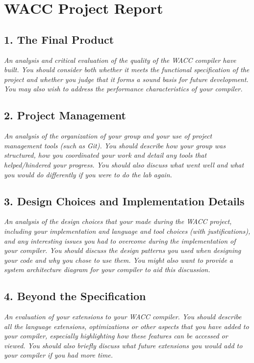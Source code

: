\documentclass[10pt,a4paper]{report}
\begin{document}
  \section*{WACC Project Report}


  \subsection*{1. The Final Product}
  \textit{An analysis and critical evaluation of the quality of the WACC compiler
  have built. You should consider both whether it meets the functional
  specification of the project and whether you judge that it forms a sound basis
  for future development. You may also wish to address the performance
  characteristics of your compiler.}

  \subsection*{2. Project Management}
  \textit{An analysis of the organization of your group and your use of project
  management tools (such as Git). You should describe how your group was
  structured, how you coordinated your work and detail any tools that
  helped/hindered your progress. You should also discuss what went well and what
  you would do differently if you were to do the lab again.}

  \subsection*{3. Design Choices and Implementation Details}
  \textit{An analysis of the design choices that your made during the WACC
  project, including your implementation and language and tool choices (with
  justifications), and any interesting issues you had to overcome during the
  implementation of your compiler. You should discuss the design patterns you
  used when designing your code and why you chose to use them. You might also
  want to provide a system architecture diagram for your compiler to aid this
  discussion.}

  \subsection*{4. Beyond the Specification}
  \textit{An evaluation of your extensions to your WACC compiler. You should
  describe all the language extensions, optimizations or other aspects that you
  have added to your compiler, especially highlighting how these features can be
  accessed or viewed. You should also briefly discuss what future extensions you
  would add to your compiler if you had more time.}
\end{document}
